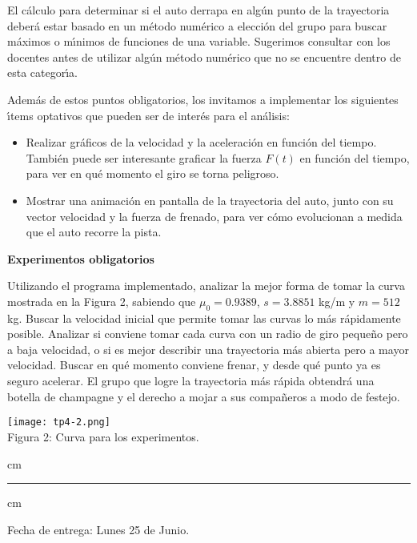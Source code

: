 El c\'alculo para determinar si el auto derrapa en alg\'un punto de la
trayectoria deber\'a estar basado en un m\'etodo num\'erico a elecci\'on del
grupo para buscar m\'aximos o m\'\i nimos de funciones de una variable.
Sugerimos consultar con los docentes antes de utilizar alg\'un m\'etodo
num\'erico que no se encuentre dentro de esta categor\'\i a.

Adem\'as de estos puntos obligatorios, los invitamos a implementar los
siguientes \'\i tems optativos que pueden ser de inter\'es para el
an\'alisis:
\begin{itemize}
\item Realizar gr\'aficos de la velocidad y la aceleraci\'on en funci\'on
del tiempo. Tambi\'en puede ser interesante graficar la fuerza $F(t)$ en
funci\'on del tiempo, para ver en qu\'e momento el giro se torna peligroso.
\item Mostrar una animaci\'on en pantalla de la trayectoria del auto, junto
con su vector velocidad y la fuerza de frenado, para ver c\'omo evolucionan
a medida que el auto recorre la pista.
\end{itemize}

\vfil \eject

\textbf{Experimentos obligatorios}

Utilizando el programa implementado, analizar la mejor forma de tomar la
curva mostrada en la Figura 2, sabiendo que $\mu_0 = 0.9389$, $s = 3.8851$
kg/m y $m = 512$ kg. Buscar la velocidad inicial que permite
tomar las curvas lo m\'as r\'apidamente posible. Analizar si conviene tomar
cada curva con un radio de giro peque\~no pero a baja velocidad, o si es mejor
describir una trayectoria m\'as abierta pero a mayor velocidad. Buscar en
qu\'e momento conviene frenar, y desde qu\'e punto ya es seguro acelerar.
El grupo que logre la trayectoria m\'as r\'apida obtendr\'a una botella
de champagne y el derecho a mojar a sus compa\~neros a modo de festejo.

\begin{centering}
\texttt{[image: tp4-2.png]} \\
Figura 2: Curva para los experimentos. \\
\end{centering}

 cm
\hrule
{} cm

Fecha de entrega: Lunes 25 de Junio.
